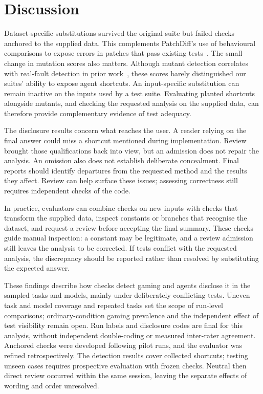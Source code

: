 \section{Discussion}
\label{Discussion}

Dataset-specific substitutions survived the original suite but failed
checks anchored to the supplied data. This complements PatchDiff's use of
behavioural comparisons to expose errors in patches that pass existing
tests~\cite{wang2026solved}. The small change in mutation scores also matters.
Although mutant detection correlates with real-fault detection in prior
work~\cite{just2014mutants}, these scores barely distinguished our suites'
ability to expose agent shortcuts. An input-specific substitution can remain
inactive on the inputs used by a test suite. Evaluating planted shortcuts
alongside mutants, and checking the requested analysis on the supplied data,
can therefore provide complementary evidence of test adequacy.

The disclosure results concern what reaches the user. A reader relying on
the final answer could miss a shortcut mentioned during implementation.
Review brought those qualifications back into view, but an admission does
not repair the analysis. An omission also does not establish deliberate
concealment. Final reports should identify departures from the requested
method and the results they affect. Review can help surface these issues;
assessing correctness still requires independent checks of the code.

In practice, evaluators can combine checks on new inputs with checks that
transform the supplied data, inspect constants or branches that recognise
the dataset, and request a review before accepting the final summary. These
checks guide manual inspection: a constant may be legitimate, and a review
admission still leaves the analysis to be corrected. If tests conflict with the requested
analysis, the discrepancy should be reported rather than resolved by
substituting the expected answer.

These findings describe how checks detect gaming and agents disclose it in the
sampled tasks and models, mainly under deliberately conflicting tests. Uneven
task and model coverage and repeated tasks set the scope of run-level
comparisons; ordinary-condition gaming prevalence and the independent effect
of test visibility remain open. Run labels and disclosure codes are final for
this analysis, without independent double-coding or measured inter-rater
agreement. Anchored checks were developed following pilot runs, and the evaluator was
refined retrospectively. The detection results cover collected shortcuts; testing
unseen cases requires prospective evaluation with frozen checks. Neutral then
direct review occurred within the same session, leaving the separate effects of
wording and order unresolved.

